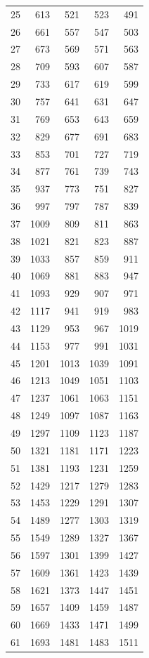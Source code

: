 \documentclass[11pt,a4paper,reqno]{amsart}
\theoremstyle{definition}
\theoremstyle{remark}
\begin{document}
\begin{longtable}{r r r r r}
25 & 613 & 521 & 523 & 491 \\
26 & 661 & 557 & 547 & 503 \\
27 & 673 & 569 & 571 & 563 \\
28 & 709 & 593 & 607 & 587 \\
29 & 733 & 617 & 619 & 599 \\
30 & 757 & 641 & 631 & 647 \\
31 & 769 & 653 & 643 & 659 \\
32 & 829 & 677 & 691 & 683 \\
33 & 853 & 701 & 727 & 719 \\
34 & 877 & 761 & 739 & 743 \\
35 & 937 & 773 & 751 & 827 \\
36 & 997 & 797 & 787 & 839 \\
37 & 1009 & 809 & 811 & 863 \\
38 & 1021 & 821 & 823 & 887 \\
39 & 1033 & 857 & 859 & 911 \\
40 & 1069 & 881 & 883 & 947 \\
41 & 1093 & 929 & 907 & 971 \\
42 & 1117 & 941 & 919 & 983 \\
43 & 1129 & 953 & 967 & 1019 \\
44 & 1153 & 977 & 991 & 1031 \\
45 & 1201 & 1013 & 1039 & 1091 \\
46 & 1213 & 1049 & 1051 & 1103 \\
47 & 1237 & 1061 & 1063 & 1151 \\
48 & 1249 & 1097 & 1087 & 1163 \\
49 & 1297 & 1109 & 1123 & 1187 \\
50 & 1321 & 1181 & 1171 & 1223 \\
51 & 1381 & 1193 & 1231 & 1259 \\
52 & 1429 & 1217 & 1279 & 1283 \\
53 & 1453 & 1229 & 1291 & 1307 \\
54 & 1489 & 1277 & 1303 & 1319 \\
55 & 1549 & 1289 & 1327 & 1367 \\
56 & 1597 & 1301 & 1399 & 1427 \\
57 & 1609 & 1361 & 1423 & 1439 \\
58 & 1621 & 1373 & 1447 & 1451 \\
59 & 1657 & 1409 & 1459 & 1487 \\
60 & 1669 & 1433 & 1471 & 1499 \\
61 & 1693 & 1481 & 1483 & 1511 \\

\end{longtable}
\end{document}
